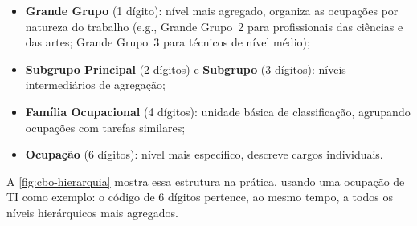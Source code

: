 \begin{itemize}
    \item \textbf{Grande Grupo} (1 dígito): nível mais agregado, organiza as ocupações por natureza do trabalho (e.g., Grande Grupo~2 para profissionais das ciências e das artes; Grande Grupo~3 para técnicos de nível médio);
    \item \textbf{Subgrupo Principal} (2 dígitos) e \textbf{Subgrupo} (3 dígitos): níveis intermediários de agregação;
    \item \textbf{Família Ocupacional} (4 dígitos): unidade básica de classificação, agrupando ocupações com tarefas similares;
    \item \textbf{Ocupação} (6 dígitos): nível mais específico, descreve cargos individuais.
\end{itemize}

A \autoref{fig:cbo-hierarquia} mostra essa estrutura na prática, usando uma ocupação de TI como exemplo: o código de 6 dígitos pertence, ao mesmo tempo, a todos os níveis hierárquicos mais agregados.

